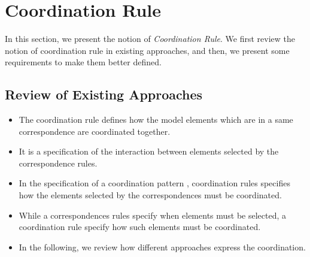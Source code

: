 \section{Coordination Rule}
In this section, we present the notion of \emph{Coordination Rule}. We first review the notion of coordination rule in existing approaches, and then, we present some requirements to make them better defined. 

\subsection{Review of Existing Approaches}
\begin{itemize}
	\item The coordination rule defines how the model elements which are in a same correspondence are coordinated together.
	\item It is a specification of the interaction between elements selected by the correspondence rules.
	\item In the specification of a coordination pattern , coordination rules specifies how the elements selected by the correspondences must be coordinated.
	\item While a correspondences rules specify when elements must be selected, a coordination rule specify how such elements must be coordinated. 
	\item In the following, we review how different approaches express the coordination.
\end{itemize}


